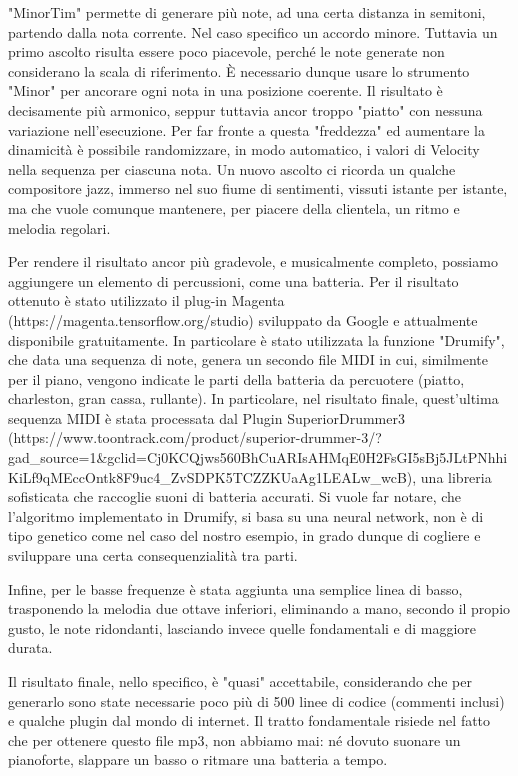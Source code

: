 \documentclass[a4paper,12pt]{report}
\begin{document}
"MinorTim" permette di generare più note, ad una certa distanza in semitoni, partendo dalla nota corrente. 
Nel caso specifico un accordo minore.
Tuttavia un primo ascolto risulta essere poco piacevole, perché le note generate non considerano la scala di riferimento.
È necessario dunque usare lo strumento "Minor" per ancorare ogni nota in una posizione coerente.
Il risultato è decisamente più armonico, seppur tuttavia ancor troppo "piatto" con nessuna variazione nell'esecuzione.
Per far fronte a questa "freddezza" ed aumentare la dinamicità è possibile randomizzare, in modo automatico, i valori di Velocity nella sequenza per ciascuna nota.
Un nuovo ascolto ci ricorda un qualche compositore jazz, immerso nel suo fiume di sentimenti, vissuti istante per istante, 
ma che vuole comunque mantenere, per piacere della clientela, un ritmo e melodia regolari.

Per rendere il risultato ancor più gradevole, e musicalmente completo, possiamo aggiungere un elemento di percussioni, come una batteria.
Per il risultato ottenuto è stato utilizzato il plug-in Magenta (https://magenta.tensorflow.org/studio) sviluppato da Google e attualmente disponibile gratuitamente.
In particolare è stato utilizzata la funzione "Drumify", che data una sequenza di note, genera un secondo file MIDI in cui, similmente per il piano, vengono indicate le parti della batteria da percuotere (piatto, charleston, gran cassa, rullante).
In particolare, nel risultato finale, quest'ultima sequenza MIDI è stata processata dal Plugin SuperiorDrummer3 (https://www.toontrack.com/product/superior-drummer-3/?gad_source=1&gclid=Cj0KCQjws560BhCuARIsAHMqE0H2FsGI5sBj5JLtPNhhiKiLf9qMEccOntk8F9uc4_ZvSDPK5TCZZKUaAg1LEALw_wcB),
una libreria sofisticata che raccoglie suoni di batteria accurati.
Si vuole far notare, che l'algoritmo implementato in Drumify, si basa su una neural network, non è di tipo genetico come nel caso del nostro esempio, in grado dunque di cogliere e sviluppare una certa consequenzialità tra parti.

Infine, per le basse frequenze è stata aggiunta una semplice linea di basso, trasponendo la melodia due ottave inferiori, eliminando a mano, secondo il propio gusto, le note ridondanti, lasciando invece quelle fondamentali e di maggiore durata.

Il risultato finale, nello specifico, è "quasi" accettabile, considerando che per generarlo sono state necessarie poco più di 500 linee di codice (commenti inclusi) e qualche plugin dal mondo di internet.
Il tratto fondamentale risiede nel fatto che per ottenere questo file mp3, non abbiamo mai: né dovuto suonare un pianoforte, slappare un basso o ritmare una batteria a tempo.
\end{document}
